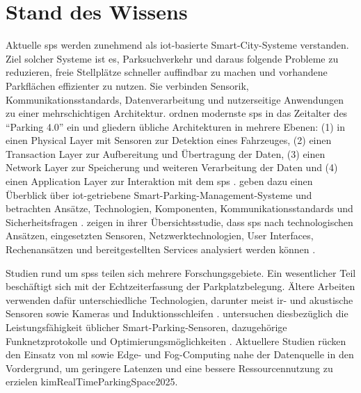 
\section{Stand des Wissens}


Aktuelle \ac{sps} werden zunehmend als \ac{iot}-basierte Smart-City-Systeme verstanden. Ziel solcher Systeme ist es, Parksuchverkehr und daraus folgende Probleme zu reduzieren, freie Stellplätze schneller auffindbar zu machen und vorhandene Parkflächen effizienter zu nutzen. Sie verbinden Sensorik, Kommunikationsstandards, Datenverarbeitung und nutzerseitige Anwendungen zu einer mehrschichtigen Architektur. \citet{rajSmartParkingSystems2024} ordnen modernste \ac{sps} in das Zeitalter des \enquote{Parking 4.0} ein und gliedern übliche Architekturen in mehrere Ebenen: 
(1) in einen Physical Layer mit Sensoren zur Detektion eines Fahrzeuges,
(2) einen Transaction Layer zur Aufbereitung und Übertragung der Daten, 
(3) einen Network Layer zur Speicherung und weiteren Verarbeitung der Daten und 
(4) einen Application Layer zur Interaktion mit dem \ac{sps} \citep{rajSmartParkingSystems2024}.
\citet{alamSurveyIoTDriven2023} geben dazu einen Überblick über \ac{iot}-getriebene Smart-Parking-Management-Systeme und betrachten Ansätze, Technologien, Komponenten, Kommunikationsstandards und Sicherheitsfragen \citep{alamSurveyIoTDriven2023}.\citet{fahimSmartParkingSystems2021} zeigen in ihrer Übersichtsstudie, dass \ac{sps} nach technologischen Ansätzen, eingesetzten Sensoren, Netzwerktechnologien, User Interfaces, Rechenansätzen und bereitgestellten Services analysiert werden können \citep{fahimSmartParkingSystems2021}.

Studien rund um \acp{sps} teilen sich mehrere Forschungsgebiete. Ein wesentlicher Teil beschäftigt sich mit der Echtzeiterfassung der Parkplatzbelegung. Ältere Arbeiten verwenden dafür unterschiedliche Technologien, darunter meist \ac{ir}- und akustische Sensoren sowie Kameras und Induktionsschleifen \citep{fahimSmartParkingSystems2021}. \citet{perkovicSmartParkingSensors2020} untersuchen diesbezüglich die Leistungsfähigkeit üblicher Smart-Parking-Sensoren, dazugehörige Funknetzprotokolle und Optimierungsmöglichkeiten \citep{perkovicSmartParkingSensors2020}. Aktuellere Studien rücken den Einsatz von \ac{ml} sowie Edge- und Fog-Computing nahe der Datenquelle in den Vordergrund, um geringere Latenzen und eine bessere Ressourcennutzung zu erzielen \citep{alaanzyRealTimeSmart2025}{kimRealTimeParkingSpace2025}. 


